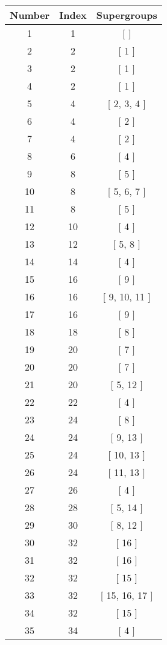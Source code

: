 \begin{center}
\begin{longtable}[H]{|| c c c ||}
\hline
Number & Index & Supergroups \\ 
\hline
1 & 1 & [ ] \\ 
\hline
2 & 2 & [ 1 ] \\ 
\hline
3 & 2 & [ 1 ] \\ 
\hline
4 & 2 & [ 1 ] \\ 
\hline
5 & 4 & [ 2, 3, 4 ] \\ 
\hline
6 & 4 & [ 2 ] \\ 
\hline
7 & 4 & [ 2 ] \\ 
\hline
8 & 6 & [ 4 ] \\ 
\hline
9 & 8 & [ 5 ] \\ 
\hline
10 & 8 & [ 5, 6, 7 ] \\ 
\hline
11 & 8 & [ 5 ] \\ 
\hline
12 & 10 & [ 4 ] \\ 
\hline
13 & 12 & [ 5, 8 ] \\ 
\hline
14 & 14 & [ 4 ] \\ 
\hline
15 & 16 & [ 9 ] \\ 
\hline
16 & 16 & [ 9, 10, 11 ] \\ 
\hline
17 & 16 & [ 9 ] \\ 
\hline
18 & 18 & [ 8 ] \\ 
\hline
19 & 20 & [ 7 ] \\ 
\hline
20 & 20 & [ 7 ] \\ 
\hline
21 & 20 & [ 5, 12 ] \\ 
\hline
22 & 22 & [ 4 ] \\ 
\hline
23 & 24 & [ 8 ] \\ 
\hline
24 & 24 & [ 9, 13 ] \\ 
\hline
25 & 24 & [ 10, 13 ] \\ 
\hline
26 & 24 & [ 11, 13 ] \\ 
\hline
27 & 26 & [ 4 ] \\ 
\hline
28 & 28 & [ 5, 14 ] \\ 
\hline
29 & 30 & [ 8, 12 ] \\ 
\hline
30 & 32 & [ 16 ] \\ 
\hline
31 & 32 & [ 16 ] \\ 
\hline
32 & 32 & [ 15 ] \\ 
\hline
33 & 32 & [ 15, 16, 17 ] \\ 
\hline
34 & 32 & [ 15 ] \\ 
\hline
35 & 34 & [ 4 ] \\ 
\hline

\end{longtable}
\end{center}
